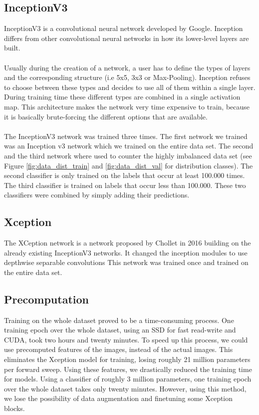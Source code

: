 \documentclass[twocolumn]{article}
\begin{document}
		\subsection{InceptionV3}
		InceptionV3 \cite{DBLP:journals/corr/SzegedyVISW15} is a convolutional neural network developed by Google. Inception differs from other convolutional neural networks in how its lower-level layers are built.
		\\
		\\
		Usually during the creation of a network, a user has to define the types of layers and the corresponding structure (i.e 5x5, 3x3 or Max-Pooling). Inception refuses to choose between these types and decides to use all of them within a single layer. During training time these different types are combined in a single activation map. This architecture makes the network very time expensive to train, because it is basically brute-forcing the different options that are available.
		\\
		\\
		The InceptionV3 network was trained three times. The first network we trained was an Inception v3 network which we trained on the entire data set. The second and the third network where used to counter the highly imbalanced data set (see Figure \ref{fig:data_dist_train} and \ref{fig:data_dist_val} for distribution classes). The second classifier is only trained on the labels that occur at least 100.000 times. The third classifier is trained on labels that occur less than 100.000. These two classifiers were combined by simply adding their predictions.
		
		\subsection{Xception}
		The XCeption network is a network proposed by Chollet in 2016 \cite{chollet2016xception} building on the already existing InceptionV3 networks. It changed the inception modules to use depthwise separable convolutions This network was trained once and trained on the entire data set.
		
        \subsection{Precomputation}
        Training on the whole dataset proved to be a time-consuming process. One training epoch over the whole dataset, using an SSD for fast read-write and CUDA, took two hours and twenty minutes. To speed up this process, we could use precomputed features of the images, instead of the actual images. This eliminates the Xception model for training, losing roughly 21 million parameters per forward sweep. Using these features, we drastically reduced the training time for models. Using a classifier of roughly 3 million parameters, one training epoch over the whole dataset takes only twenty minutes. However, using this method, we lose the possibility of data augmentation and finetuning some Xception blocks.
        
\end{document}
